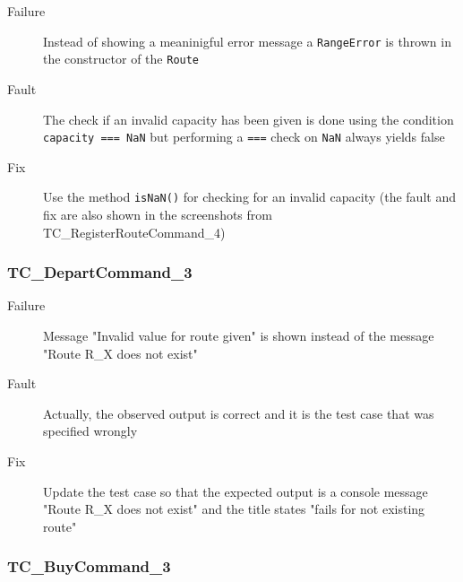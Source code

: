 \documentclass[11pt]{article}
\begin{document}
\begin{description}
\item[{Failure}] Instead of showing a meaninigful error message a \texttt{RangeError} is thrown in the constructor of the \texttt{Route}
\item[{Fault}] The check if an invalid capacity has been given is done using the condition \texttt{capacity === NaN} but performing a \texttt{===} check on \texttt{NaN} always yields false
\item[{Fix}] Use the method \texttt{isNaN()} for checking for an invalid capacity (the fault and fix are also shown in the screenshots from TC\_RegisterRouteCommand\_4)
\end{description}

\subsubsection{TC\_DepartCommand\_3}
\label{sec:org809604d}

\begin{description}
\item[{Failure}] Message "Invalid value for route given" is shown instead of the message "Route R\_X does not exist"
\item[{Fault}] Actually, the observed output is correct and it is the test case that was specified wrongly
\item[{Fix}] Update the test case so that the expected output is a console message "Route R\_X does not exist" and the title states "fails for not existing route"
\end{description}

\subsubsection{TC\_BuyCommand\_3}
\label{sec:org85b3bf6}
\end{document}

